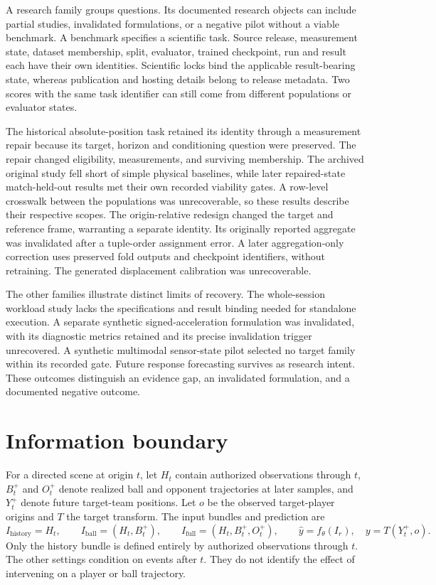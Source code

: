 \documentclass[10pt]{article}
\begin{document}
A research family groups questions. Its documented research objects can include partial studies, invalidated formulations, or a negative pilot without a viable benchmark. A benchmark specifies a scientific task. Source release, measurement state, dataset membership, split, evaluator, trained checkpoint, run and result each have their own identities. Scientific locks bind the applicable result-bearing state, whereas publication and hosting details belong to release metadata. Two scores with the same task identifier can still come from different populations or evaluator states.

The historical absolute-position task retained its identity through a measurement repair because its target, horizon and conditioning question were preserved. The repair changed eligibility, measurements, and surviving membership. The archived original study fell short of simple physical baselines, while later repaired-state match-held-out results met their own recorded viability gates. A row-level crosswalk between the populations was unrecoverable, so these results describe their respective scopes. The origin-relative redesign changed the target and reference frame, warranting a separate identity. Its originally reported aggregate was invalidated after a tuple-order assignment error. A later aggregation-only correction uses preserved fold outputs and checkpoint identifiers, without retraining. The generated displacement calibration was unrecoverable.

The other families illustrate distinct limits of recovery. The whole-session workload study lacks the specifications and result binding needed for standalone execution. A separate synthetic signed-acceleration formulation was invalidated, with its diagnostic metrics retained and its precise invalidation trigger unrecovered. A synthetic multimodal sensor-state pilot selected no target family within its recorded gate. Future response forecasting survives as research intent. These outcomes distinguish an evidence gap, an invalidated formulation, and a documented negative outcome.

\section{Information boundary}
\label{sec:information}

For a directed scene at origin $t$, let $H_t$ contain authorized observations through $t$, $B_t^+$ and $O_t^+$ denote realized ball and opponent trajectories at later samples, and $Y_t^+$ denote future target-team positions. Let $o$ be the observed target-player origins and $T$ the target transform. The input bundles and prediction are
\begin{equation}
 I_{\mathrm{history}}=H_t,\qquad
 I_{\mathrm{ball}}=(H_t,B_t^+),\qquad
 I_{\mathrm{full}}=(H_t,B_t^+,O_t^+),\qquad
 \widehat{y}=f_\theta(I_r),\quad y=T(Y_t^+,o).
\end{equation}
Only the history bundle is defined entirely by authorized observations through $t$. The other settings condition on events after $t$. They do not identify the effect of intervening on a player or ball trajectory.
\end{document}
